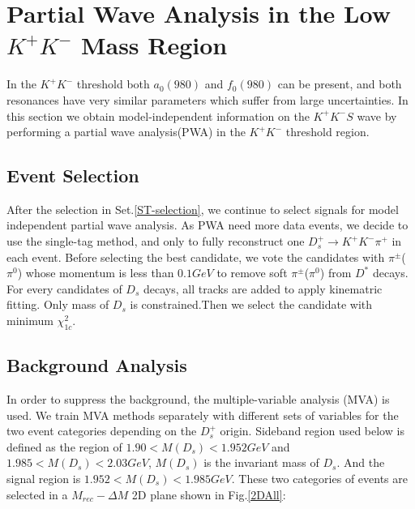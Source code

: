 \section{Partial Wave Analysis in the Low $K^{+}K^{-}$ Mass Region}
\par{In the $K^{+}K^{-}$ threshold both $a_{0}(980)$ and $f_{0}(980)$ can be present, and both resonances have very similar parameters which suffer from large uncertainties. In this section we obtain model-independent information on the $K^{+}K^{-} S$ wave by performing a partial wave analysis(PWA) in the  $K^{+}K^{-}$ threshold region.}
\subsection{Event Selection}
\label{MIPWASelection}
\par{
    After the selection in Set.\ref{ST-selection}, we continue to select signals for model independent partial wave analysis.
    As PWA need more data events, we decide to use the single-tag method, and only to fully reconstruct one $D_{s}^{+} \rightarrow K^{+}K^{-}\pi^{+}$ in each event. 
Before selecting the best candidate,  we vote the candidates with $\pi^{\pm}$($\pi^{0}$) whose momentum is less than $0.1GeV$ to remove soft $\pi^{\pm}$($\pi^{0}$) from $D^{*}$ decays.
For every candidates of $D_{s}$ decays, all tracks are added to apply kinematric fitting. 
Only mass of $D_{s}$ is constrained.Then we select the candidate with minimum $\chi_{1c}^{2}$.
}
\subsection{Background Analysis}
In order to suppress the background, the multiple-variable analysis (MVA) is used. We train MVA methods separately with different sets of variables for the two event categories depending on the $D_{s}^{+}$ origin. 
Sideband region used below is defined as the region of  $1.90 < M(D_{s}) < 1.952 GeV$ and   $1.985 < M(D_{s}) < 2.03 GeV$, $M(D_{s})$ is the invariant mass of $D_{s}$.
And the signal region is $1.952 < M(D_{s}) < 1.985 GeV$.
These two categories of events are selected in a $M_{rec}-\Delta{M}$ 2D plane shown in Fig.\ref{2DAll}:




